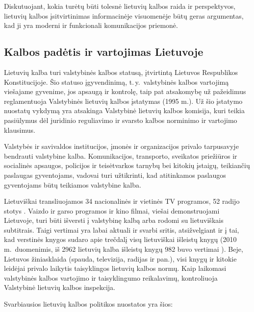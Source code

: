 \begin{multicols}{2}
Diskutuojant, kokia turėtų būti tolesnė lietuvių kalbos raida ir perspektyvos, lietuvių kalbos įsitvirtinimas informacinėje visuomenėje būtų geras argumentas, kad ji yra moderni ir funkcionali komunikacijos priemonė.

\subsection{Kalbos padėtis ir vartojimas Lietuvoje}

Lietuvių kalba turi valstybinės kalbos statusą, įtvirtintą Lietuvos Respublikos Konstitucijoje. Šio statuso įgyvendinimą, t.\,y.~valstybinės kalbos vartojimą viešajame gyvenime, jos apsaugą ir kontrolę, taip pat atsakomybę už pažeidimus reglamentuoja Valstybinės lietuvių kalbos įstatymas (1995 m.). Už šio įstatymo nuostatų vykdymą yra atsakinga Valstybinė lietuvių kalbos komisija, kuri teikia pasiūlymus dėl juridinio reguliavimo ir svarsto kalbos norminimo ir vartojimo klausimus.  


 Valstybės ir savivaldos institucijos, įmonės ir organizacijos privalo tarpusavyje bendrauti valstybine kalba. Komunikacijos, transporto, sveikatos priežiūros ir socialinės apsaugos, policijos ir teisėtvarkos tarnybų bei kitokių įstaigų, teikiančių paslaugas gyventojams, vadovai turi užtikrinti, kad atitinkamos paslaugos gyventojams būtų teikiamos valstybine kalba.   

    Lietuviškai transliuojamos 34 nacionalinės ir vietinės TV programos, 52 radijo stotys \cite{ldrt}.  Vaizdo ir garso programos ir kino filmai, viešai demonstruojami Lietuvoje, turi būti išversti į valstybinę kalbą arba rodomi su lietuviškais subtitrais. Taigi vertimai yra labai aktuali ir svarbi sritis, atsižvelgiant ir į tai, kad verstinės knygos sudaro apie trečdalį visų lietuviškai išleistų knygų (2010 m.~duomenimis, iš 2962 lietuvių kalba išleistų knygų 982 buvo vertimai \cite{bbsc}).  Beje, Lietuvos žiniasklaida (spauda, televizija, radijas ir pan.), visi knygų ir kitokie leidėjai privalo laikytis taisyklingos lietuvių kalbos normų. Kaip laikomasi valstybinės kalbos vartojimo ir taisyklingumo reikalavimų, kontroliuoja Valstybinė lietuvių kalbos inspekcija.   

    Svarbiausios lietuvių kalbos politikos nuostatos yra šios:   


\end{multicols}
